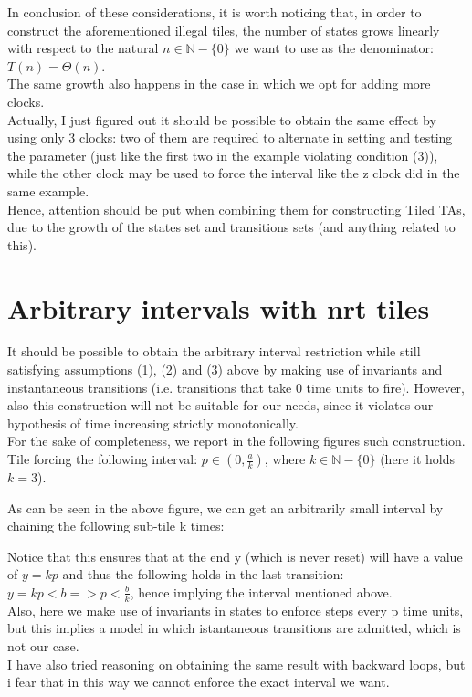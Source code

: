 \documentclass[12pt, a4paper]{article}
\begin{document}
\noindent
In conclusion of these considerations, it is worth noticing that, in order to construct the aforementioned illegal tiles, the number of states grows linearly with respect to the natural $n \in \mathbb{N}-\{0\}$ we want to use as the denominator: $T(n) = \Theta(n)$.\\
The same growth also happens in the case in which we opt for adding more clocks.\\
Actually, I just figured out it should be possible to obtain the same effect by using only 3 clocks: two of them are required to alternate in setting and testing the parameter (just like the first two in the example violating condition (3)), while the other clock may be used to force the interval like the z clock did in the same example.\\
Hence, attention should be put when combining them for constructing Tiled TAs, due to the growth of the states set and transitions sets (and anything related to this).

\newpage

\section{Arbitrary intervals with nrt tiles}

\noindent
It should be possible to obtain the arbitrary interval restriction while still satisfying assumptions (1), (2) and (3) above by making use of invariants and instantaneous transitions (i.e. transitions that take 0 time units to fire). However, also this construction will not be suitable for our needs, since it violates our hypothesis of time increasing strictly monotonically.\\
For the sake of completeness, we report in the following figures such construction.\\

Tile forcing the following interval: $p \in (0, \frac{a}{k})$, where $k \in \mathbb{N}-\{0\}$ (here it holds $k = 3$).



\noindent
As can be seen in the above figure, we can get an arbitrarily small interval by chaining the following sub-tile k times:



\noindent
Notice that this ensures that at the end y (which is never reset) will have a value of $y = kp$ and thus the following holds in the last transition: $y = kp < b => p < \frac{b}{k}$, hence implying the interval mentioned above.\\
Also, here we make use of invariants in states to enforce steps every p time units, but this implies a model in which istantaneous transitions are admitted, which is not our case.\\
I have also tried reasoning on obtaining the same result with backward loops, but i fear that in this way we cannot enforce the exact interval we want.\\
\end{document}
